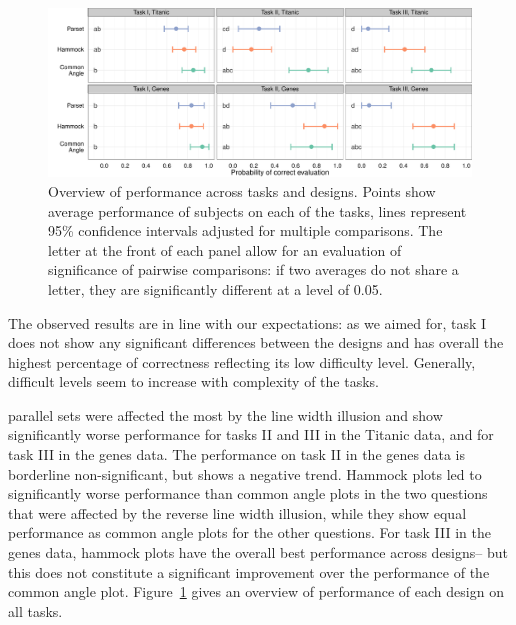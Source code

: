 \documentclass[journal]{vgtc}\usepackage{graphicx, color}
\begin{document}
\begin{figure}
\centering
\includegraphics[width=\textwidth]{model-summary.pdf}
\caption{\label{fig:model-summary}Overview of performance across tasks and designs. Points show average performance of subjects on each of the tasks, lines represent 95\% confidence intervals adjusted for multiple comparisons. The letter at the front of each panel allow for an evaluation of significance of pairwise comparisons: if two averages do not share a letter, they are significantly different at a level of 0.05.}
\end{figure}

The observed results are in line with our expectations:
as we aimed for, task I does not show any significant differences between the designs and has overall the highest percentage of correctness reflecting its low difficulty level. Generally, difficult levels seem to increase with complexity of the tasks.

parallel sets were affected the most by the line width illusion and show significantly worse performance for tasks II and III in the Titanic data, and for task III in the genes data. The performance on task II in the genes data is borderline non-significant, but shows a negative trend.
Hammock plots led to significantly worse performance than common angle plots in the two questions that were affected by the reverse line width illusion, while they show equal performance as common angle plots for the other questions. For task III in the genes data,  hammock plots have the overall best performance  across designs-- but this  does not  constitute a significant improvement over the performance of the common angle plot. Figure~\ref{fig:model-summary} gives an overview of  performance of each design on all tasks. 
\end{document}
